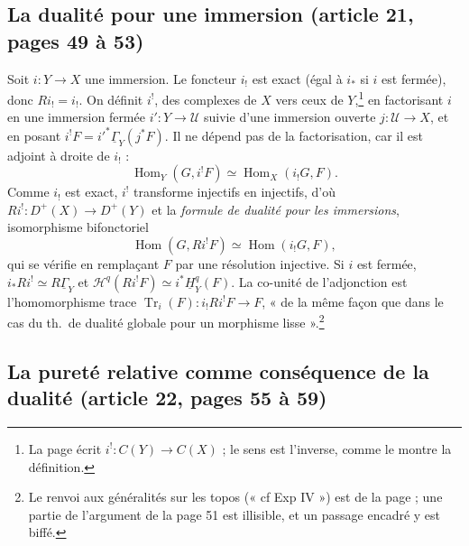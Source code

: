 \documentclass[11pt,a4paper]{article}
\begin{document}
\subsection*{La dualité pour une immersion (article 21, pages 49 à 53)}

Soit $i : Y \to X$ une immersion. Le foncteur $i_{!}$ est exact (égal à $i_{*}$
si $i$ est fermée), donc $Ri_{!} = i_{!}$. On définit $i^{!}$, des complexes
de $X$ vers ceux de $Y$,\footnote{La page écrit $i^{!} : C(Y) \to C(X)$ ; le
sens est l'inverse, comme le montre la définition.} en factorisant $i$ en une
immersion fermée $i' : Y \to \mathcal{U}$ suivie d'une immersion ouverte $j :
\mathcal{U} \to X$, et en posant $i^{!}F = i'^{*}\underline{\Gamma}_{Y}(j^{*}F)$.
Il ne dépend pas de la factorisation, car il est adjoint à droite de $i_{!}$ :
\[
  \operatorname{Hom}_{Y}(G, i^{!}F) \simeq \operatorname{Hom}_{X}(i_{!}G, F).
\]
Comme $i_{!}$ est exact, $i^{!}$ transforme injectifs en injectifs, d'où $Ri^{!}
: D^{+}(X) \to D^{+}(Y)$ et la \emph{formule de dualité pour les immersions},
isomorphisme bifonctoriel
\[
  \operatorname{Hom}(G, Ri^{!}F) \simeq \operatorname{Hom}(i_{!}G, F),
\]
qui se vérifie en remplaçant $F$ par une résolution injective. Si $i$ est
fermée, $i_{*}Ri^{!} \simeq R\underline{\Gamma}_{Y}$ et
$\mathcal{H}^{q}(Ri^{!}F) \simeq i^{*}\underline{H}^{q}_{Y}(F)$. La co-unité de
l'adjonction est l'homomorphisme trace $\operatorname{Tr}_{i}(F) : i_{!}Ri^{!}F
\to F$, « de la même façon que dans le cas du th.\ de dualité globale pour un
morphisme lisse ».\footnote{Le renvoi aux généralités sur les topos
(« cf Exp IV ») est de la page ; une partie de l'argument de la page 51 est
illisible, et un passage encadré y est biffé.}

\subsection*{La pureté relative comme conséquence de la dualité (article 22, pages 55 à 59)}
\end{document}
